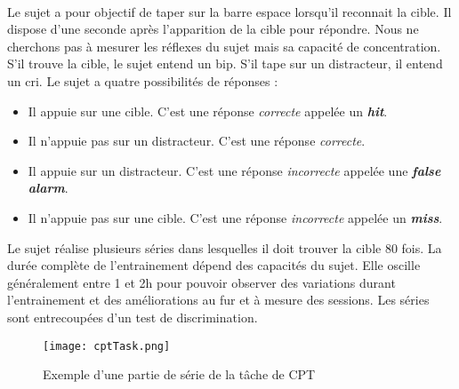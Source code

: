 \paragraph{}Le sujet a pour objectif de taper sur la barre espace lorsqu'il reconnait la cible. Il dispose d'une seconde après l'apparition de la cible pour répondre. Nous ne cherchons
pas à mesurer les réflexes du sujet mais sa capacité de concentration. S'il trouve la cible, le sujet entend un bip. S'il tape sur un distracteur, il entend un cri. Le sujet a quatre
possibilités de réponses :
\begin{itemize}
\item Il appuie sur une cible. C'est une réponse \emph{correcte} appelée un \textbf{\emph{hit}}.
\item Il n'appuie pas sur un distracteur. C'est une réponse \emph{correcte}.
\item Il appuie sur un distracteur. C'est une réponse \emph{incorrecte} appelée une \textbf{\emph{false alarm}}.
\item Il n'appuie pas sur une cible. C'est une réponse \emph{incorrecte} appelée un \textbf{\emph{miss}}.
\end{itemize}
Le sujet réalise plusieurs séries dans lesquelles il doit trouver la cible 80 fois. La durée complète de l'entrainement dépend des capacités du sujet. Elle oscille généralement entre
1 et 2h pour pouvoir observer des variations durant l'entrainement et des améliorations au fur et à mesure des sessions. Les séries sont entrecoupées d'un test de discrimination.

\begin{figure}[H]
    \begin{center}
    \texttt{[image: cptTask.png]}
    \end{center}
    \caption{Exemple d'une partie de série de la tâche de CPT}
\label{CptTask}
\end{figure}

